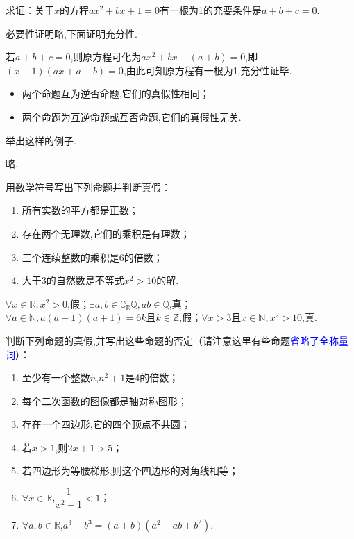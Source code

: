 \documentclass[lang=cn,newtx,10pt,scheme=chinese]{elegantbook}
\begin{document}
\begin{exercise}\label{zhw2000_g1_P51.78}
  求证：关于$x$的方程$ax^2+bx+1=0$有一根为1的充要条件是$a+b+c=0$.
\end{exercise}

\begin{solution}
  必要性证明略,下面证明充分性.

  若$a+b+c=0$,则原方程可化为$ax^2+bx-(a+b)=0$,即$(x-1)(ax+a+b)=0$,由此可知原方程有一根为1.充分性证毕.
\end{solution}

\hspace*{\fill}
\begin{itemize}
  \item 两个命题互为逆否命题,它们的真假性相同；
  \item 两个命题为互逆命题或互否命题,它们的真假性无关.
\end{itemize}
\begin{problem}
  举出这样的例子.
\end{problem}
\begin{solution}
  略.
\end{solution}

\begin{exercise}
  用数学符号写出下列命题并判断真假：
\end{exercise}

\begin{enumerate}
  \item 所有实数的平方都是正数；
  \item 存在两个无理数,它们的乘积是有理数；
  \item 三个连续整数的乘积是6的倍数；
  \item 大于3的自然数是不等式$x^2>10$的解.
\end{enumerate}

\begin{solution}
  $\forall x\in\mathbb{R},x^2>0$,假；$\exists a,b\in\complement_{\mathbb{R}}\mathbb{Q},ab\in\mathbb{Q}$,真；$\forall a\in\mathbb{N},a(a-1)(a+1)=6k\text{且}k\in\mathbb{Z}$,假；$\forall x>3\text{且}x\in\mathbb{N},x^2>10$,真.
\end{solution}

\begin{exercise}
  判断下列命题的真假,并写出这些命题的否定（请注意这里有些命题\textcolor{blue}{省略了全称量词}）：
\end{exercise}

\begin{enumerate}
  \item 至少有一个整数$n$,$n^2+1$是4的倍数；
  \item 每个二次函数的图像都是轴对称图形；
  \item 存在一个四边形,它的四个顶点不共圆；
  \item 若$x>1$,则$2x+1>5$；
  \item 若四边形为等腰梯形,则这个四边形的对角线相等；
  \item $\forall x{\in}\mathbb{R}$,$\dfrac1{x^2+1}<1$；
  \item $\forall a,b{\in}\mathbb{R}$,$a^3+b^3=(a+b)(a^2-ab+b^2)$.
\end{enumerate}
\end{document}
